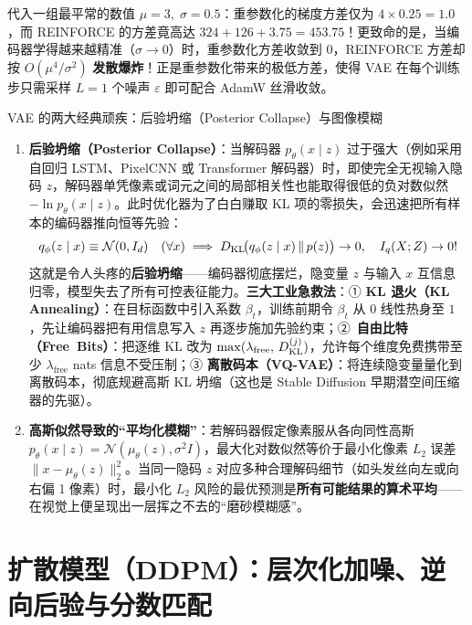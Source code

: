 代入一组最平常的数值 $\mu = 3,\; \sigma = 0.5$：重参数化的梯度方差仅为 $4 \times 0.25 = 1.0$，而 REINFORCE 的方差竟高达 $324 + 126 + 3.75 = \mathbf{453.75}$！更致命的是，当编码器学得越来越精准（$\sigma \to 0$）时，重参数化方差收敛到 $0$，REINFORCE 方差却按 $O(\mu^4 / \sigma^2)$ \textbf{发散爆炸}！正是重参数化带来的极低方差，使得 VAE 在每个训练步只需采样 $L = 1$ 个噪声 $\varepsilon$ 即可配合 AdamW 丝滑收敛。

\begin{failBox}{VAE 的两大经典顽疾：后验坍缩（Posterior Collapse）与图像模糊}
\begin{enumerate}
  \item \textbf{后验坍缩（Posterior Collapse）}：当解码器 $p_\theta(x \mid z)$ 过于强大（例如采用自回归 LSTM、PixelCNN 或 Transformer 解码器）时，即使完全无视输入隐码 $z$，解码器单凭像素或词元之间的局部相关性也能取得很低的负对数似然 $-\ln p_\theta(x \mid z)$。此时优化器为了白白赚取 KL 项的零损失，会迅速把所有样本的编码器推向恒等先验：
  \[
    q_\phi(z \mid x) \equiv \mathcal{N}(0, I_d) \quad (\forall x) \implies D_{\mathrm{KL}}\!\big(q_\phi(z \mid x) \,\|\, p(z)\big) \to 0,\quad I_q(X; Z) \to 0!
  \]
  这就是令人头疼的\textbf{后验坍缩}——编码器彻底摆烂，隐变量 $z$ 与输入 $x$ 互信息归零，模型失去了所有可控表征能力。\textbf{三大工业急救法}：① \textbf{KL 退火（KL Annealing）}：在目标函数中引入系数 $\beta_t$，训练前期令 $\beta_t$ 从 $0$ 线性热身至 $1$，先让编码器把有用信息写入 $z$ 再逐步施加先验约束；\mbox{② \textbf{自由比特（Free Bits）}}：把逐维 KL 改为 $\max(\lambda_{\text{free}},\, D_{\mathrm{KL}}^{(j)})$，允许每个维度免费携带至少 $\lambda_{\text{free}}$ nats 信息不受压制；③ \textbf{离散码本（VQ-VAE）}：将连续隐变量量化到离散码本，彻底规避高斯 KL 坍缩（这也是 Stable Diffusion 早期潜空间压缩器的先驱）。
  \item \textbf{高斯似然导致的“平均化模糊”}：若解码器假定像素服从各向同性高斯 $p_\theta(x \mid z) = \mathcal{N}(\mu_\theta(z), \sigma^2 I)$，最大化对数似然等价于最小化像素 $L_2$ 误差 $\|x - \mu_\theta(z)\|_2^2$。当同一隐码 $z$ 对应多种合理解码细节（如头发丝向左或向右偏 1 像素）时，最小化 $L_2$ 风险的最优预测是\textbf{所有可能结果的算术平均}——在视觉上便呈现出一层挥之不去的“磨砂模糊感”。
\end{enumerate}
\end{failBox}

\section{扩散模型（DDPM）：层次化加噪、逆向后验与分数匹配}
\label{sec:ddpm}

